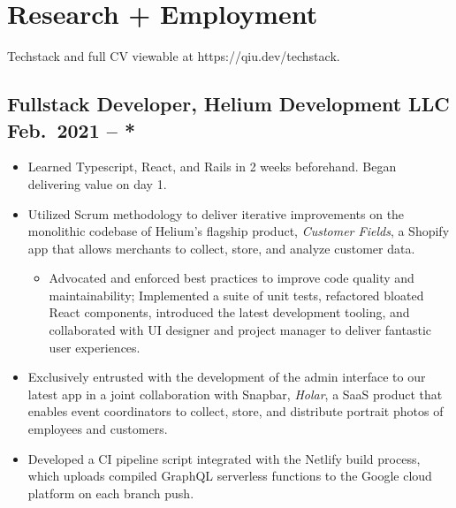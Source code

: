 \documentclass{article}
\begin{document}
\section{Research + Employment}

Techstack and full CV viewable at https://qiu.dev/techstack.

\subsection{Fullstack Developer, Helium Development LLC \hfill Feb.\ 2021 -- *}
\begin{itemize}[noitemsep,nolistsep]
	\item Learned Typescript, React, and Rails in 2 weeks beforehand. Began
		delivering value on day 1.

	\item Utilized Scrum methodology to deliver iterative improvements on the
		monolithic codebase of Helium's flagship product, \emph{Customer Fields},
		a Shopify app that allows merchants to collect, store, and analyze
		customer data.

		\begin{itemize}[noitemsep,nolistsep]
			\item Advocated and enforced best practices to improve code quality
				and maintainability; Implemented a suite of unit tests,
				refactored bloated React components, introduced the latest
				development tooling, and collaborated with UI designer and
				project manager to deliver fantastic user experiences.
		\end{itemize}

	\item Exclusively entrusted with the development of the admin interface to
		our latest app in a joint collaboration with Snapbar, \emph{Holar}, a
		SaaS product that enables event coordinators to collect, store, and
		distribute portrait photos of employees and customers.

	\item Developed a CI pipeline script integrated with the Netlify build
		process, which uploads compiled GraphQL serverless functions to the
		Google cloud platform on each branch push.
\end{itemize}
\end{document}
